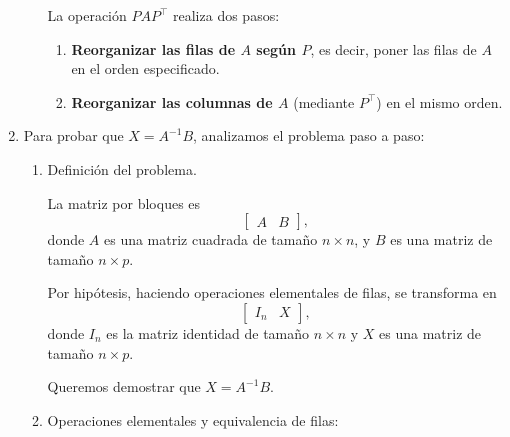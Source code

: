 \begin{enumerate}[label=\color{red}\textbf{\arabic*)}]
\begin{enumerate}[label=\arabic*)]
                La operación $PAP^\intercal$ realiza dos pasos:
                \begin{enumerate}[label=\arabic*)]
                    \item \textbf{Reorganizar las filas de $A$ según $P$}, es decir, poner las filas de $A$ en el orden especificado.
                    \item  \textbf{Reorganizar las columnas de $A$} (mediante $P^\intercal$) en el mismo orden.
                \end{enumerate}
        \end{enumerate}
    \item {}

    Para probar que $X=A^{-1}B$, analizamos el problema paso a paso:
    \begin{enumerate}[label=\arabic*)]
        \item Definición del problema.

            La matriz por bloques es \[
            \begin{bmatrix} 
                A & B 
            \end{bmatrix}, 
            \] donde $A$ es una matriz cuadrada de tamaño  $n\times n$, y $B$ es una matriz de tamaño  $n\times p$.

            Por hipótesis, haciendo operaciones elementales de filas, se transforma en \[
            \begin{bmatrix} 
                I_n & X 
            \end{bmatrix}, 
            \] donde $I_n$ es la matriz identidad de tamaño  $n\times n$ y $X$ es una matriz de tamaño  $n\times p$.

            Queremos demostrar que $X=A^{-1}B$.
        \item Operaciones elementales y equivalencia de filas:


\end{enumerate}
\end{enumerate}
